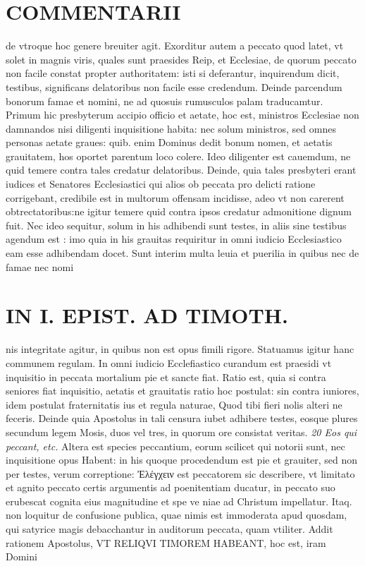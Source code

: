\documentclass{article}
\begin{document}
\begin{pages}
\section*{COMMENTARII }
\marginpar{[ p.134 ]}\pstart de vtroque hoc genere breuiter agit.  \pend\pstart Exorditur autem a peccato quod latet, vt solet in magnis viris, quales sunt praesides Reip, et Ecclesiae, de quorum peccato non facile constat propter authoritatem: isti si deferantur, inquirendum dicit, testibus, significans delatoribus non facile esse credendum. Deinde parcendum bonorum famae et nomini, ne ad quosuis rumusculos palam traducamtur. Primum hic presbyterum accipio officio et aetate, hoc est, ministros Ecclesiae non damnandos nisi diligenti inquisitione habita: nec solum ministros, sed omnes personas aetate graues: quib. enim Dominus dedit bonum nomen, et aetatis grauitatem, hos oportet parentum loco colere. Ideo diligenter est cauemdum, ne quid temere contra tales credatur delatoribus. Deinde, quia tales presbyteri erant iudices et Senatores Ecclesiastici qui alios ob peccata pro delicti ratione corrigebant, credibile est in multorum offensam incidisse, adeo vt non carerent obtrectatoribus:ne igitur temere quid contra ipsos credatur admonitione dignum fuit. Nec ideo sequitur, solum in his adhibendi sunt testes, in aliis sine testibus agendum est : imo quia in his grauitas requiritur in omni iudicio Ecclesiastico eam esse adhibendam docet. Sunt interim multa leuia et puerilia in quibus nec de famae nec nomi\pend
\section*{IN I. EPIST. AD TIMOTH. }
\marginpar{[ p.135. ]}\pstart nis integritate agitur, in quibus non est opus fimili rigore. Statuamus igitur hanc communem regulam. In omni iudicio Ecclefiastico curandum est praesidi vt inquisitio in peccata mortalium pie et sancte fiat. Ratio est, quia si contra seniores fiat inquisitio, aetatis et grauitatis ratio hoc postulat: sin contra iuniores, idem postulat fraternitatis ius et regula naturae, Quod tibi fieri nolis alteri ne feceris.  \pend\pstart Deinde quia Apostolus in tali censura iubet adhibere testes, eosque plures secundum legem Mosis, duos vel tres, in quorum ore consistat veritas.  \pend
\textit{20 Eos qui peccant, etc. }\pstart Altera est species peccantium, eorum scilicet qui notorii sunt, nec inquisitione opus Habent: in his quoque procedendum est pie et grauiter, sed non per testes, verum correptione: Ἐλέγχειν est peccatorem sic describere, vt limitato et agnito peccato certis argumentis ad poenitentiam ducatur, in peccato suo erubescat cognita eius magnitudine et spe ve niae ad Christum impellatur. Itaq. non loquitur de confusione publica, quae nimis est immoderata apud quosdam, qui satyrice magis debacchantur in auditorum peccata, quam vtiliter. Addit rationem Apostolus, VT RELIQVI TIMOREM HABEANT, hoc est, iram Domini  \pend

\end{pages}
\end{document}
